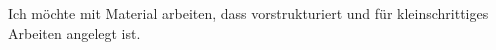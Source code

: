 Ich möchte mit Material arbeiten, dass vorstrukturiert und für kleinschrittiges Arbeiten angelegt ist.